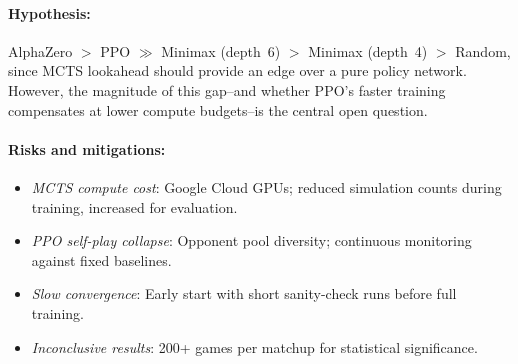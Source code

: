 \documentclass[10pt]{article}
\begin{document}
\paragraph{Hypothesis:}
AlphaZero $>$ PPO $\gg$ Minimax (depth~6) $>$ Minimax (depth~4) $>$ Random, since MCTS lookahead should provide an edge over a pure policy network. However, the magnitude of this gap--and whether PPO's faster training compensates at lower compute budgets--is the central open question.

\paragraph{Risks and mitigations:}
\begin{itemize}[nosep,leftmargin=*]
    \item \emph{MCTS compute cost}: Google Cloud GPUs; reduced simulation counts during training, increased for evaluation.
    \item \emph{PPO self-play collapse}: Opponent pool diversity; continuous monitoring against fixed baselines.
    \item \emph{Slow convergence}: Early start with short sanity-check runs before full training.
    \item \emph{Inconclusive results}: 200+ games per matchup for statistical significance.
\end{itemize}

{\footnotesize

}
\end{document}
